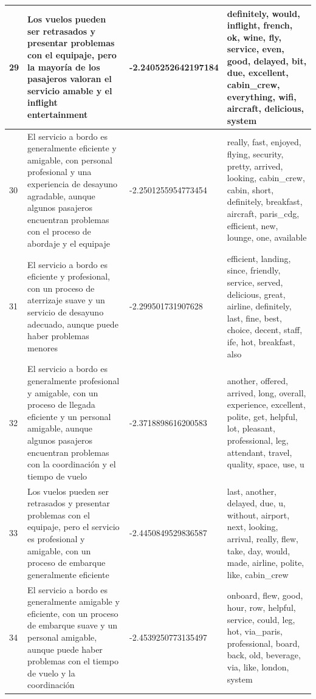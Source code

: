 \documentclass{report}
\begin{document}
{\begin{longtable}{|p{1cm}|p{4cm}|p{4cm}|p{6cm}|}
                    \hline
                    29 & Los vuelos pueden ser retrasados y presentar problemas con el equipaje, pero la mayoría de los pasajeros valoran el servicio amable y el inflight entertainment & -2.2405252642197184 & definitely, would, inflight, french, ok, wine, fly, service, even, good, delayed, bit, due, excellent, cabin\_crew, everything, wifi, aircraft, delicious, system \\
                    \hline
                    30 & El servicio a bordo es generalmente eficiente y amigable, con personal profesional y una experiencia de desayuno agradable, aunque algunos pasajeros encuentran problemas con el proceso de abordaje y el equipaje & -2.2501255954773454 & really, fast, enjoyed, flying, security, pretty, arrived, looking, cabin\_crew, cabin, short, definitely, breakfast, aircraft, paris\_cdg, efficient, new, lounge, one, available \\
                    \hline
                    31 & El servicio a bordo es eficiente y profesional, con un proceso de aterrizaje suave y un servicio de desayuno adecuado, aunque puede haber problemas menores & -2.299501731907628 & efficient, landing, since, friendly, service, served, delicious, great, airline, definitely, last, fine, best, choice, decent, staff, ife, hot, breakfast, also \\
                    \hline
                    32 & El servicio a bordo es generalmente profesional y amigable, con un proceso de llegada eficiente y un personal amigable, aunque algunos pasajeros encuentran problemas con la coordinación y el tiempo de vuelo & -2.3718898616200583 & another, offered, arrived, long, overall, experience, excellent, polite, get, helpful, lot, pleasant, professional, leg, attendant, travel, quality, space, use, u \\
                    \hline
                    33 & Los vuelos pueden ser retrasados y presentar problemas con el equipaje, pero el servicio es profesional y amigable, con un proceso de embarque generalmente eficiente & -2.4450849529836587 & last, another, delayed, due, u, without, airport, next, looking, arrival, really, flew, take, day, would, made, airline, polite, like, cabin\_crew \\
                    \hline
                    34 & El servicio a bordo es generalmente amigable y eficiente, con un proceso de embarque suave y un personal amigable, aunque puede haber problemas con el tiempo de vuelo y la coordinación & -2.4539250773135497 & onboard, flew, good, hour, row, helpful, service, could, leg, hot, via\_paris, professional, board, back, old, beverage, via, like, london, system \\

\end{longtable}}
\end{document}
